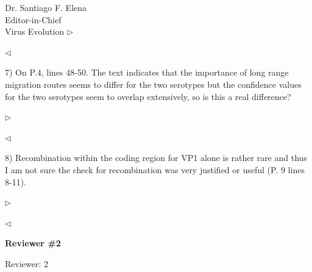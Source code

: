 \documentclass[ucla,biomath,12pt,noaddrfooter,datefrom]{UC_letter}
\newenvironment{reply}{$\triangleright$\bf}{$\triangleleft$}
\begin{document}
\begin{letter}{
Dr. Santiago F. Elena \\
Editor-in-Chief \\
Virus Evolution
}
\begin{reply}

\end{reply}

7)      On P.4, lines 48-50. The text indicates that the importance of long range migration routes seems to differ for the two serotypes but the confidence values for the two serotypes seem to overlap extensively, so is this a real difference?

\begin{reply}

\end{reply}

8)      Recombination within the coding region for VP1 alone is rather rare and thus I am not sure the check for recombination was very justified or useful (P. 9 lines 8-11).

\begin{reply}

\end{reply}


\textbf{Reviewer \#2}

Reviewer: 2


\end{letter}
\end{document}
